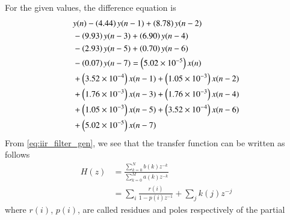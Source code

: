 \documentclass[journal,12pt,twocolumn]{IEEEtran}
\renewcommand\thesection{\arabic{section}}
\begin{document}
\begin{enumerate}[label=\thesection.\arabic*]
\solution
For the given values, the difference equation is
\begin{align}
	&y(n) - \left(4.44\right)y(n - 1) + \left(8.78\right)y(n - 2) \nonumber \\
	&- \left(9.93\right)y(n - 3) + \left(6.90\right)y(n - 4) \nonumber \\
	&- \left(2.93\right)y(n - 5) \nonumber + \left(0.70\right)y(n - 6) \nonumber \\
	&- \left(0.07\right)y(n - 7) = \left(5.02 \times 10^{-5}\right)x(n) \nonumber \\
	&+ \left(3.52 \times 10^{-4}\right)x(n - 1) + \left(1.05 \times 10^{-3}\right)x(n - 2) \nonumber \\
	&+ \left(1.76 \times 10^{-3}\right)x(n - 3) + \left(1.76 \times 10^{-3}\right)x(n - 4) \nonumber \\
	&+ \left(1.05 \times 10^{-3}\right)x(n - 5) + \left(3.52 \times 10^{-4}\right)x(n - 6) \nonumber \\
	&+ \left(5.02 \times 10^{-5}\right)x(n - 7)
\end{align}
From \eqref{eq:iir_filter_gen}, we see that the transfer function can be written as follows
\begin{align}
	H(z) &= \frac{\sum_{k = 0}^{N}b(k)z^{-k}}{\sum_{k = 0}^{M}a(k)z^{-k}} \\
		 &= \sum_{i}\frac{r(i)}{1 - p(i)z^{-1}} + \sum_{j}k(j)z^{-j}
	\label{eq:trans-func}
\end{align}
where $r(i)$, $p(i)$, are called residues and poles respectively of the partial 

\end{enumerate}
\end{document}
